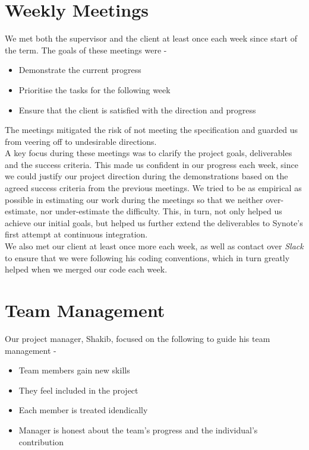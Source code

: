 \section{Weekly Meetings}
\label{sec:weekly-meetings}
We met both the supervisor and the client at least once each week since start of the term. The goals of these meetings were -

\begin{itemize}

  \item Demonstrate the current progress
  \item Prioritise the tasks for the following week
  \item Ensure that the client is satisfied with the direction and progress

\end{itemize}

The meetings mitigated the risk of not meeting the specification and guarded us from veering off to undesirable directions.\\

A key focus during these meetings was to clarify the project goals, deliverables and the success criteria. This made us confident in our progress each week, since we could justify our project direction during the demonstrations based on the agreed success criteria from the previous meetings. We tried to be as empirical as possible in estimating our work during the meetings so that we neither over-estimate, nor under-estimate the difficulty. This, in turn, not only helped us achieve our initial goals, but helped us further extend the deliverables to Synote's first attempt at continuous integration. \\

We also met our client at least once more each week, as well as contact over \textit{Slack} to ensure that we were following his coding conventions, which in turn greatly helped when we merged our code each week.

\section{Team Management}
\label{sec:people-management}
Our project manager, Shakib, focused on the following to guide his team management \cite{iansommerville2011}-

\begin{itemize}

  \item Team members gain new skills
  \item They feel included in the project
  \item Each member is treated idendically
  \item Manager is honest about the team's progress and the individual's contribution

\end{itemize}

